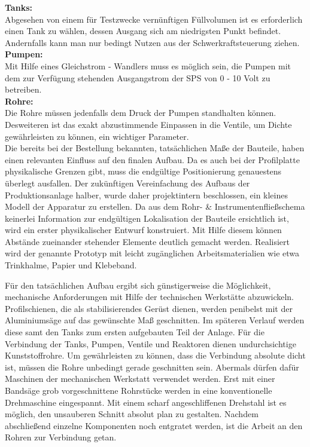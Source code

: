 	\textbf{Tanks:}\\
	Abgesehen von einem für Testzwecke vernünftigen Füllvolumen ist es erforderlich einen Tank zu wählen, dessen Ausgang sich am niedrigsten Punkt befindet. Andernfalls kann man nur bedingt Nutzen aus der Schwerkraftsteuerung ziehen.\\
	
	\textbf{Pumpen:}\\
	Mit Hilfe eines Gleichstrom - Wandlers muss es möglich sein, die Pumpen mit dem zur Verfügung stehenden Ausgangstrom der SPS von 0 - 10 Volt zu betreiben.\\
	
	\textbf{Rohre:}\\
	Die Rohre müssen jedenfalls dem Druck der Pumpen standhalten können. Desweiteren ist das exakt abzustimmende Einpassen in die Ventile, um Dichte gewährleisten zu können, ein wichtiger Parameter.\\

	Die bereits bei der Bestellung bekannten, tatsächlichen Maße der Bauteile, haben einen relevanten Einfluss auf den finalen Aufbau. Da es auch bei der Profilplatte physikalische Grenzen gibt, muss die endgültige Positionierung genauestens überlegt ausfallen. Der zukünftigen Vereinfachung des Aufbaus der Produktionsanlage halber, wurde daher projektintern beschlossen, ein kleines Modell der Apparatur zu erstellen. Da aus dem Rohr- \& Instrumentenfließschema keinerlei Information zur endgültigen Lokalisation der Bauteile ersichtlich ist, wird ein erster physikalischer Entwurf konstruiert. Mit Hilfe diesem können Abstände zueinander stehender Elemente deutlich gemacht werden. Realisiert wird der genannte Prototyp mit leicht zugänglichen Arbeitsmaterialien wie etwa Trinkhalme, Papier und Klebeband.\\
	

	Für den tatsächlichen Aufbau ergibt sich günstigerweise die Möglichkeit, mechanische Anforderungen mit Hilfe der technischen Werkstätte abzuwickeln. Profilschienen, die als stabilisierendes Gerüst dienen, werden penibelst mit der Aluminiumsäge auf das gewünschte Maß geschnitten. Im späteren Verlauf werden diese samt den Tanks zum ersten aufgebauten Teil der Anlage. Für die Verbindung der Tanks, Pumpen, Ventile und Reaktoren dienen undurchsichtige Kunststoffrohre. Um gewährleisten zu können, dass die Verbindung absolute dicht ist, müssen die Rohre unbedingt gerade geschnitten sein. Abermals dürfen dafür Maschinen der mechanischen Werkstatt verwendet werden. Erst mit einer Bandsäge grob vorgeschnittene Rohrstücke werden in eine konventionelle Drehmaschine eingespannt. Mit einem scharf angeschliffenen Drehstahl ist es möglich, den unsauberen Schnitt absolut plan zu gestalten. Nachdem abschließend einzelne Komponenten noch entgratet werden, ist die Arbeit an den Rohren zur Verbindung getan.\\
	
